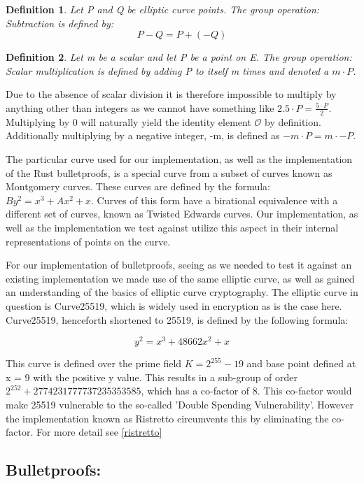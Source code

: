\documentclass{article}
\newtheorem{definition}{Definition}[section]
\begin{document}
\begin{definition}
	Let P and Q be elliptic curve points. The group operation: Subtraction is defined by:
	$$P-Q = P + (-Q)$$
\end{definition}

\begin{definition}
	Let m be a scalar and let P be a point on E. The group operation: Scalar multiplication is defined by adding P to itself m times and denoted a $m\cdot P$.
\end{definition}

Due to the absence of scalar division it is therefore impossible to multiply by anything other than integers as we cannot have something like $2.5 \cdot P = \frac{5\cdot P}{2}$. Multiplying by 0 will naturally yield the identity element $\mathcal{O}$ by definition. Additionally multiplying by a negative integer, -m, is defined as $-m\cdot P = m\cdot -P$. 

The particular curve used for our implementation, as well as the implementation of the Rust bulletproofs, is a special curve from a subset of curves known as Montgomery curves. These curves are defined by the formula: $By^2 = x^3 + Ax^2 + x$. Curves of this form have a birational equivalence with a different set of curves, known as Twisted Edwards curves. Our implementation, as well as the implementation we test against utilize this aspect in their internal representations of points on the curve.

For our implementation of bulletproofs, seeing as we needed to test it against an existing implementation we made use of the same elliptic curve, as well as gained an understanding of the basics of elliptic curve cryptography. The elliptic curve in question is Curve25519, which is widely used in encryption as is the case here. Curve25519, henceforth shortened to 25519, is defined by the following formula:

$$y^2 = x^3 + 48662x^2 + x$$

This curve is defined over the prime field $K = 2^{255} - 19$ and base point defined at x = 9 with the positive y value. This results in a sub-group of order $2^{252} + 2774231777737235353585$, which has a co-factor of 8. This co-factor would make 25519 vulnerable to the so-called 'Double Spending Vulnerability'. However the implementation known as Ristretto circumvents this by eliminating the co-factor. For more detail see \ref{ristretto} 

\subsection{Bulletproofs:}\label{Bulletproofs}
\end{document}
